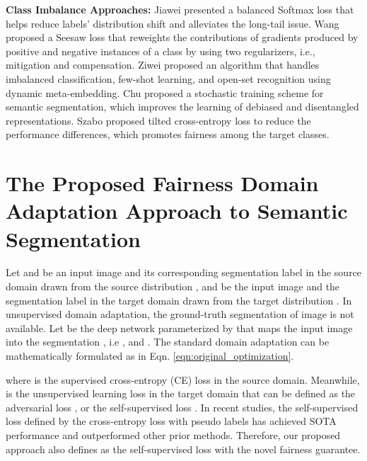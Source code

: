 \documentclass[10pt,twocolumn,letterpaper]{article}
\begin{document}
\noindent \textbf{Class Imbalance Approaches:} 
Jiawei \etal \cite{ren2020balanced} presented a balanced Softmax loss that helps reduce labels' distribution shift and alleviates the long-tail issue. 
Wang \etal \cite{wang2021seesaw} proposed a Seesaw loss that reweights the contributions of gradients produced by positive and negative instances of a class by using two regularizers, i.e., mitigation and compensation. Ziwei \etal \cite{liu2019largescale} proposed an algorithm that handles imbalanced classification, few-shot learning, and open-set recognition using dynamic meta-embedding. Chu \etal \cite{chu2021learning} proposed a stochastic training scheme for semantic segmentation, which improves the learning of debiased and disentangled representations. Szabo \etal \cite{szabo2021tilted} proposed tilted cross-entropy loss to reduce the performance differences, which promotes fairness among the target classes.

\vspace{-2mm}
\section{The Proposed Fairness Domain Adaptation Approach to Semantic Segmentation}
\vspace{-1mm}

Let  and  be an input image and its corresponding segmentation label in the source domain drawn from the source distribution ,
 and  be the input image and the segmentation label in the target domain drawn from the target distribution . 
In unsupervised domain adaptation, the ground-truth segmentation  of image  is not available.
Let  be the deep network parameterized by  that maps the input image  into the segmentation , i.e , and .
The standard domain adaptation can be mathematically formulated as in Eqn. \eqref{eqn:original_optimization}.
\vspace{-4.5mm}

where  is the supervised cross-entropy (CE) loss in the source domain.
Meanwhile,  is the unsupervised learning loss in the target domain that can be defined as the adversarial loss \cite{tsai2018learning, tsai2019domain, vu2019advent, pan2020unsupervised}, 
or the self-supervised loss \cite{Araslanov:2021:DASAC, zhang2021prototypical, daformer}. In recent studies, the self-supervised loss defined by the cross-entropy loss with pseudo labels has achieved SOTA performance and outperformed other prior methods. Therefore, our proposed approach also defines  as the self-supervised loss \cite{Araslanov:2021:DASAC, daformer} with the novel fairness guarantee.
\end{document}
